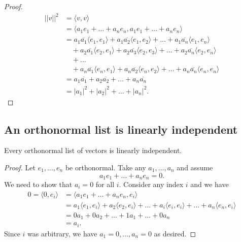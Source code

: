 \documentclass[11pt]{article}
\begin{document}
    \begin{proof}
        \begin{align*}
            ||v||^2 &= \langle v,v \rangle \\
                    &= \langle a_1 e_1 + \dots + a_n e_n, a_1 e_1 + \dots + a_n e_n \rangle \\
                    &= a_1 \overline{a_1} \langle e_1, e_1 \rangle + a_1 \overline{a_2} \langle e_1, e_2 \rangle + \dots + a_1 \overline{a_n} \langle e_1, e_n \rangle \\
                    & \quad + a_2 \overline{a_1} \langle e_2, e_1 \rangle + a_2 \overline{a_3} \langle e_2, e_3 \rangle + \dots + a_2 \overline{a_n} \langle e_2, e_n \rangle \\
                    & \quad + \dots \\
                    & \quad + a_n \overline{a_1} \langle e_n, e_1 \rangle + a_n \overline{a_2} \langle e_n, e_2 \rangle + \dots + a_n \overline{a_n} \langle e_n, e_n \rangle \\
                    &= a_1 \overline{a_1} + a_2 \overline{a_2} + \dots + a_n \overline{a_n} \\
                    &= |a_1|^2 + |a_2|^2 + \dots + |a_n|^2.
        \end{align*}
    \end{proof}

    \subsection{An orthonormal list is linearly independent}
    
    Every orthonormal list of vectors is linearly independent. 
    \begin{proof}
        Let \(e_1, \dots, e_n\) be orthonormal. Take any \(a_1, \dots, a_n\) and assume \[a_1 e_1 + \dots + a_n e_n = 0.\] We need to show that \(a_i = 0\) for all $i$. Consider any index $i$ and we have 
        \begin{align*}
            0 = \langle 0, e_i \rangle &= \langle a_1 e_1 + \dots + a_n e_n, e_i \rangle \\
                                       &= a_1 \langle e_1, e_i \rangle + a_2 \langle e_2, e_i \rangle + \dots + a_i \langle e_i, e_i \rangle + \dots + a_n \langle e_n, e_i \rangle \\
                                       &= 0 a_1 + 0 a_2 + \dots + 1 a_1 + \dots + 0 a_n \\
                                       &= a_i.
        \end{align*}
        Since $i$ was arbitrary, we have \(a_1 = 0, \dots, a_n = 0\) as desired. 
    \end{proof}
\end{document}
